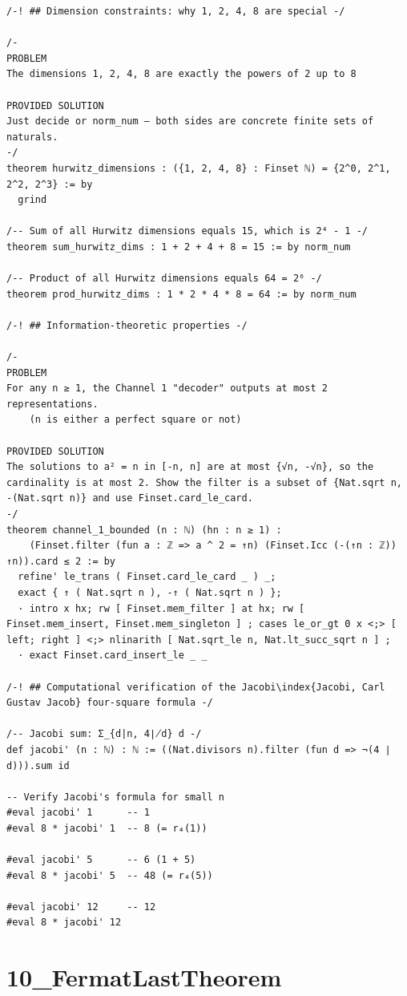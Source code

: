 \documentclass[11pt,openany]{book}
\theoremstyle{definition}
\theoremstyle{plain}
\theoremstyle{remark}
\begin{document}
\begin{lstlisting}[style=lean]
/-! ## Dimension constraints: why 1, 2, 4, 8 are special -/

/-
PROBLEM
The dimensions 1, 2, 4, 8 are exactly the powers of 2 up to 8

PROVIDED SOLUTION
Just decide or norm_num — both sides are concrete finite sets of naturals.
-/
theorem hurwitz_dimensions : ({1, 2, 4, 8} : Finset ℕ) = {2^0, 2^1, 2^2, 2^3} := by
  grind

/-- Sum of all Hurwitz dimensions equals 15, which is 2⁴ - 1 -/
theorem sum_hurwitz_dims : 1 + 2 + 4 + 8 = 15 := by norm_num

/-- Product of all Hurwitz dimensions equals 64 = 2⁶ -/
theorem prod_hurwitz_dims : 1 * 2 * 4 * 8 = 64 := by norm_num

/-! ## Information-theoretic properties -/

/-
PROBLEM
For any n ≥ 1, the Channel 1 "decoder" outputs at most 2 representations.
    (n is either a perfect square or not)

PROVIDED SOLUTION
The solutions to a² = n in [-n, n] are at most {√n, -√n}, so the cardinality is at most 2. Show the filter is a subset of {Nat.sqrt n, -(Nat.sqrt n)} and use Finset.card_le_card.
-/
theorem channel_1_bounded (n : ℕ) (hn : n ≥ 1) :
    (Finset.filter (fun a : ℤ => a ^ 2 = ↑n) (Finset.Icc (-(↑n : ℤ)) ↑n)).card ≤ 2 := by
  refine' le_trans ( Finset.card_le_card _ ) _;
  exact { ↑ ( Nat.sqrt n ), -↑ ( Nat.sqrt n ) };
  · intro x hx; rw [ Finset.mem_filter ] at hx; rw [ Finset.mem_insert, Finset.mem_singleton ] ; cases le_or_gt 0 x <;> [ left; right ] <;> nlinarith [ Nat.sqrt_le n, Nat.lt_succ_sqrt n ] ;
  · exact Finset.card_insert_le _ _

/-! ## Computational verification of the Jacobi\index{Jacobi, Carl Gustav Jacob} four-square formula -/

/-- Jacobi sum: Σ_{d|n, 4∤d} d -/
def jacobi' (n : ℕ) : ℕ := ((Nat.divisors n).filter (fun d => ¬(4 ∣ d))).sum id

-- Verify Jacobi's formula for small n
#eval jacobi' 1      -- 1
#eval 8 * jacobi' 1  -- 8 (= r₄(1))

#eval jacobi' 5      -- 6 (1 + 5)
#eval 8 * jacobi' 5  -- 48 (= r₄(5))

#eval jacobi' 12     -- 12
#eval 8 * jacobi' 12
\end{lstlisting}

\clearpage

\section*{10\_FermatLastTheorem}
\end{document}
